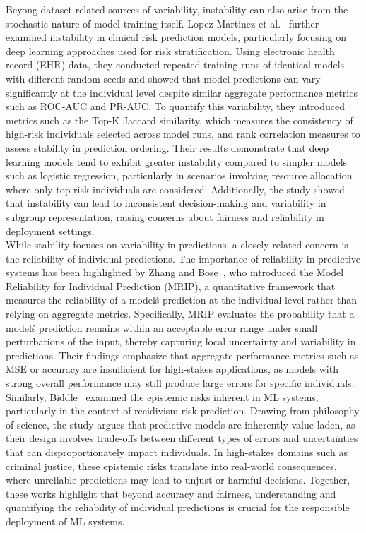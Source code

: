 \documentclass[12pt]{article}
\begin{document}
Beyong dataset-related sources of variability, instability can also arise from the stochastic nature of model training itself. Lopez-Martinez et al.~\cite{lopez2022instability} further examined instability in clinical risk prediction models, particularly focusing on deep learning approaches used for risk stratification. Using electronic health record (EHR) data, they conducted repeated training runs of identical models with different random seeds and showed that model predictions can vary significantly at the individual level despite similar aggregate performance metrics such as ROC-AUC and PR-AUC. To quantify this variability, they introduced metrics such as the Top-K Jaccard similarity, which measures the consistency of high-risk individuals selected across model runs, and rank correlation measures to assess stability in prediction ordering. Their results demonstrate that deep learning models tend to exhibit greater instability compared to simpler models such as logistic regression, particularly in scenarios involving resource allocation where only top-risk individuals are considered. Additionally, the study showed that instability can lead to inconsistent decision-making and variability in subgroup representation, raising concerns about fairness and reliability in deployment settings.\\

While stability focuses on variability in predictions, a closely related concern is the reliability of individual predictions. The importance of reliability in predictive systems has been highlighted by Zhang and Bose~\cite{zhang2024reliability}, who introduced the Model Reliability for Individual Prediction (MRIP), a quantitative framework that measures the reliability of a model\'s prediction at the individual level rather than relying on aggregate metrics. Specifically, MRIP evaluates the probability that a model\'s prediction remains within an acceptable error range under small perturbations of the input, thereby capturing local uncertainty and variability in predictions. Their findings emphasize that aggregate performance metrics such as MSE or accuracy are insufficient for high-stakes applications, as models with strong overall performance may still produce large errors for specific individuals. Similarly, Biddle~\cite{biddle2022predicting} examined the epistemic risks inherent in ML systems, particularly in the context of recidivism risk prediction. Drawing from philosophy of science, the study argues that predictive models are inherently value-laden, as their design involves trade-offs between different types of errors and uncertainties that can disproportionately impact individuals. In high-stakes domains such as criminal justice, these epistemic risks translate into real-world consequences, where unreliable predictions may lead to unjust or harmful decisions. Together, these works highlight that beyond accuracy and fairness, understanding and quantifying the reliability of individual predictions is crucial for the responsible deployment of ML systems.\\
\end{document}
